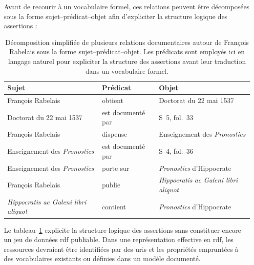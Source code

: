 Avant de recourir à un vocabulaire formel, ces relations peuvent être décomposées sous la forme sujet--prédicat--objet afin d'expliciter la structure logique des assertions :

\begin{table}[htbp]
	\centering
	\small
	\begin{tabular}{p{} p{} p{}}
		\toprule
		\textbf{Sujet} & \textbf{Prédicat} & \textbf{Objet} \\
		\midrule
		
		François Rabelais
		& obtient
		& Doctorat du 22 mai 1537 \\
		
		Doctorat du 22 mai 1537
		& est documenté par
		& S~5, fol.~33 \\
		
		François Rabelais
		& dispense
		& Enseignement des \emph{Pronostics} \\
		
		Enseignement des \emph{Pronostics}
		& est documenté par
		& S~4, fol.~36 \\
		
		Enseignement des \emph{Pronostics}
		& porte sur
		& \emph{Pronostics} d'Hippocrate \\
		
		François Rabelais
		& publie
		& \emph{Hippocratis ac Galeni libri aliquot} \\
		
		\emph{Hippocratis ac Galeni libri aliquot}
		& contient
		& \emph{Pronostics} d'Hippocrate \\
		
		\bottomrule
	\end{tabular}
	
	\caption[Décomposition de relations documentaires autour de François Rabelais]
	{Décomposition simplifiée de plusieurs relations documentaires autour de François Rabelais sous la forme sujet--prédicat--objet. Les prédicats sont employés ici en langage naturel pour expliciter la structure des assertions avant leur traduction dans un vocabulaire formel.}
	\label{tab:rabelais-triplets-rdf}
\end{table}

Le tableau~\ref{tab:rabelais-triplets-rdf} explicite la structure logique des assertions sans constituer encore un jeu de données \gls{rdf} publiable. Dans une représentation effective en \gls{rdf}, les ressources devraient être identifiées par des \glspl{uri} et les propriétés empruntées à des vocabulaires existants ou définies dans un modèle documenté.


